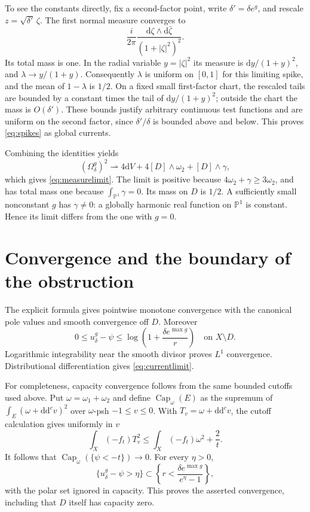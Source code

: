 \documentclass[11pt]{article}
\newcommand{\ddc}{\mathrm d\mathrm d^c}
\begin{document}
To see the constants directly, fix a second-factor point, write
$\delta'=\delta e^g$, and rescale $z=\sqrt{\delta'}\,\zeta$.
The first normal measure converges to
\[
 \frac{i}{2\pi}\frac{\mathrm d\zeta\wedge\mathrm d\bar\zeta}
                              {(1+|\zeta|^2)^2}.
\]
Its total mass is one. In the radial variable $y=|\zeta|^2$ its measure
is $\mathrm dy/(1+y)^2$, and $\lambda\to y/(1+y)$. Consequently
$\lambda$ is uniform on $[0,1]$ for this limiting spike, and
the mean of $1-\lambda$ is $1/2$. On a fixed small first-factor chart,
the rescaled tails are bounded by a constant times the tail of
$\mathrm dy/(1+y)^2$; outside the chart the mass is $O(\delta')$.
These bounds justify arbitrary continuous test functions and are
uniform on the second factor, since $\delta'/\delta$ is bounded
above and below. This proves \eqref{eq:spikes} as global currents.

Combining the identities yields
\[
 (\Omega_\delta^g)^2\rightharpoonup
       4\mathrm dV+4[D]\wedge\omega_2+[D]\wedge\gamma,
\]
which gives \eqref{eq:measurelimit}. The limit is positive because
$4\omega_2+\gamma\ge3\omega_2$, and has total mass one because
$\int_{\mathbb P^1}\gamma=0$. Its mass on $D$ is $1/2$.
A sufficiently small nonconstant $g$ has $\gamma\ne0$: a globally
harmonic real function on $\mathbb P^1$ is constant. Hence its limit
differs from the one with $g=0$.

\section{Convergence and the boundary of the obstruction}

The explicit formula gives pointwise monotone convergence with the
canonical pole values and smooth convergence off $D$. Moreover
\[
 0\le u_\delta^g-\psi
    \le\log\left(1+\frac{\delta e^{\max g}}r\right)
 \quad\text{on }X\setminus D.
\]
Logarithmic integrability near the smooth divisor proves $L^1$
convergence. Distributional differentiation gives
\eqref{eq:currentlimit}.

For completeness, capacity convergence follows from the same bounded
cutoffs used above. Put $\omega=\omega_1+\omega_2$ and define
$\operatorname{Cap}_\omega(E)$ as the supremum of
$\int_E(\omega+\ddc v)^2$ over $\omega$-psh $-1\le v\le0$.
With $T_v=\omega+\ddc v$, the cutoff calculation gives uniformly in $v$
\[
 \int_X(-f_t)T_v^2
     \le\int_X(-f_t)\omega^2+\frac2t.
\]
It follows that $\operatorname{Cap}_\omega(\{\psi<-t\})\to0$.
For every $\eta>0$,
\[
 \{u_\delta^g-\psi>\eta\}\subset
   \left\{r<\frac{\delta e^{\max g}}{e^\eta-1}\right\},
\]
with the polar set ignored in capacity. This proves the asserted
convergence, including that $D$ itself has capacity zero.
\end{document}
